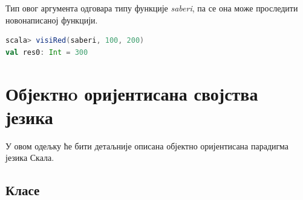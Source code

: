 \documentclass[12pt,oneside]{memoir}
\begin{document}
Тип овог аргумента одговара типу функције \textit{saberi}, па се она може проследити новонаписаној функцији.

\begin{lstlisting}[language=Scala, caption={Прослеђивање функције функцији}, label={lst:scala_function_add_high_order}, basicstyle=\small]
scala> visiRed(saberi, 100, 200)
val res0: Int = 300
\end{lstlisting}


%
%
%

\section{Објектнo оријентисана својства језика}
\label{sec:scala_oop}

У овом одељку ће бити детаљније описана објектно оријентисана парадигма језика Скала.

\subsection{Класе}
\label{subsec:scala_klase}
\end{document}

